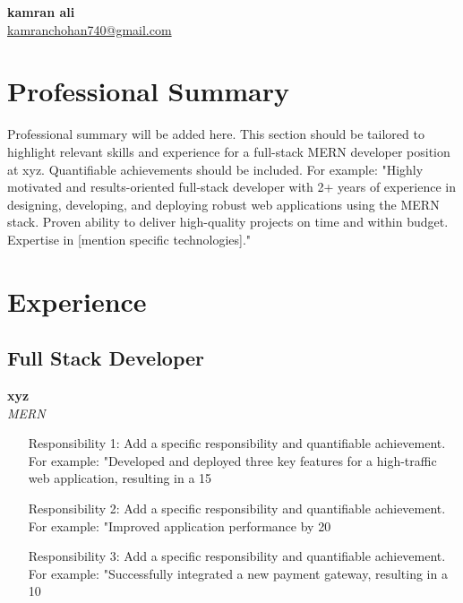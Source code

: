 \documentclass[11pt,a4paper]{article}
\begin{document}
\begin{center}
    \textbf{\Huge kamran ali} \\
    \href{mailto:kamranchohan740@gmail.com}{kamranchohan740@gmail.com}
\end{center}

\vspace{1cm}

\section{Professional Summary}
Professional summary will be added here.  This section should be tailored to highlight relevant skills and experience for a full-stack MERN developer position at xyz.  Quantifiable achievements should be included.  For example: "Highly motivated and results-oriented full-stack developer with 2+ years of experience in designing, developing, and deploying robust web applications using the MERN stack. Proven ability to deliver high-quality projects on time and within budget. Expertise in [mention specific technologies]."


\section{Experience}
\subsection{Full Stack Developer}
\textbf{xyz} \\
\textit{MERN} \\

\begin{itemize}[noitemsep]
    \item  [Responsibility 1:]  Add a specific responsibility and quantifiable achievement. For example: "Developed and deployed three key features for a high-traffic web application, resulting in a 15%
    \item  [Responsibility 2:] Add a specific responsibility and quantifiable achievement.  For example: "Improved application performance by 20%
    \item  [Responsibility 3:] Add a specific responsibility and quantifiable achievement. For example: "Successfully integrated a new payment gateway, resulting in a 10%
\end{itemize}
\end{document}
